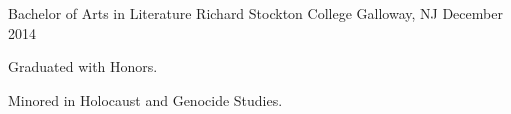

\begin{cventries}

  \cventry
    {Bachelor of Arts in Literature} %
    {Richard Stockton College} %
    {Galloway, NJ} %
    {December 2014} %
    {
      \begin{cvitems} %
        \item {Graduated with Honors.}
        \item {Minored in Holocaust and Genocide Studies.}
      \end{cvitems}
    }

\end{cventries}
